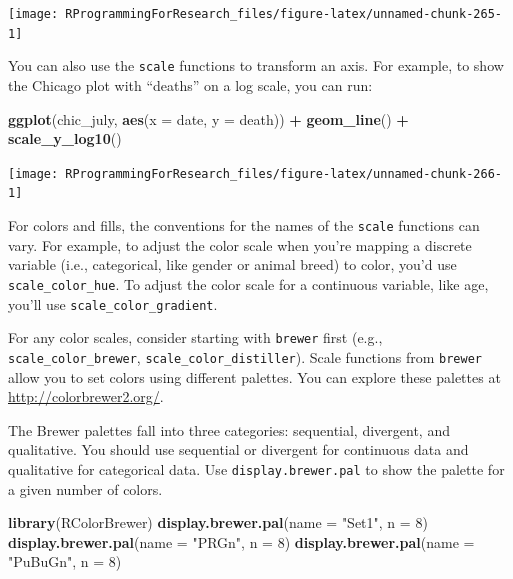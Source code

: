 \documentclass[]{book}
\makeatletter
\newenvironment{Shaded}{\begin{snugshade}}{\end{snugshade}}
\newcommand{\KeywordTok}[1]{\textcolor[rgb]{0.13,0.29,0.53}{\textbf{#1}}}
\newcommand{\DataTypeTok}[1]{\textcolor[rgb]{0.13,0.29,0.53}{#1}}
\newcommand{\DecValTok}[1]{\textcolor[rgb]{0.00,0.00,0.81}{#1}}
\newcommand{\StringTok}[1]{\textcolor[rgb]{0.31,0.60,0.02}{#1}}
\newcommand{\OperatorTok}[1]{\textcolor[rgb]{0.81,0.36,0.00}{\textbf{#1}}}
\newcommand{\NormalTok}[1]{#1}
\newenvironment{kframe}{%
\medskip{}
\setlength{\fboxsep}{.8em}
 \def\at@end@of@kframe{}%
 \ifinner\ifhmode%
  \def\at@end@of@kframe{\end{minipage}}%
  \begin{minipage}{\columnwidth}%
 \fi\fi%
 \def\FrameCommand##1{\hskip\@totalleftmargin \hskip-\fboxsep
 \colorbox{shadecolor}{##1}\hskip-\fboxsep
     \hskip-\linewidth \hskip-\@totalleftmargin \hskip\columnwidth}%
 \MakeFramed {\advance\hsize-\width
   \@totalleftmargin\z@ \linewidth\hsize
   \@setminipage}}%
 {\par\unskip\endMakeFramed%
 \at@end@of@kframe}
\renewenvironment{Shaded}{\begin{kframe}}{\end{kframe}}
\theoremstyle{definition}
\theoremstyle{definition}
\theoremstyle{definition}
\theoremstyle{remark}
\makeatother
\begin{document}
\begin{center}\texttt{[image: RProgrammingForResearch\_files/figure-latex/unnamed-chunk-265-1]} \end{center}

You can also use the \texttt{scale} functions to transform an axis. For
example, to show the Chicago plot with ``deaths'' on a log scale, you
can run:

\begin{Shaded}
\begin{Highlighting}[]
\KeywordTok{ggplot}\NormalTok{(chic_july, }\KeywordTok{aes}\NormalTok{(}\DataTypeTok{x =}\NormalTok{ date, }\DataTypeTok{y =}\NormalTok{ death)) }\OperatorTok{+}\StringTok{ }
\StringTok{  }\KeywordTok{geom_line}\NormalTok{() }\OperatorTok{+}
\StringTok{  }\KeywordTok{scale_y_log10}\NormalTok{()}
\end{Highlighting}
\end{Shaded}

\begin{center}\texttt{[image: RProgrammingForResearch\_files/figure-latex/unnamed-chunk-266-1]} \end{center}

For colors and fills, the conventions for the names of the
\texttt{scale} functions can vary. For example, to adjust the color
scale when you're mapping a discrete variable (i.e., categorical, like
gender or animal breed) to color, you'd use \texttt{scale\_color\_hue}.
To adjust the color scale for a continuous variable, like age, you'll
use \texttt{scale\_color\_gradient}.

For any color scales, consider starting with \texttt{brewer} first
(e.g., \texttt{scale\_color\_brewer}, \texttt{scale\_color\_distiller}).
Scale functions from \texttt{brewer} allow you to set colors using
different palettes. You can explore these palettes at
\url{http://colorbrewer2.org/}.

The Brewer palettes fall into three categories: sequential, divergent,
and qualitative. You should use sequential or divergent for continuous
data and qualitative for categorical data. Use
\texttt{display.brewer.pal} to show the palette for a given number of
colors.

\begin{Shaded}
\begin{Highlighting}[]
\KeywordTok{library}\NormalTok{(RColorBrewer)}
\KeywordTok{display.brewer.pal}\NormalTok{(}\DataTypeTok{name =} \StringTok{"Set1"}\NormalTok{, }\DataTypeTok{n =} \DecValTok{8}\NormalTok{)}
\KeywordTok{display.brewer.pal}\NormalTok{(}\DataTypeTok{name =} \StringTok{"PRGn"}\NormalTok{, }\DataTypeTok{n =} \DecValTok{8}\NormalTok{)}
\KeywordTok{display.brewer.pal}\NormalTok{(}\DataTypeTok{name =} \StringTok{"PuBuGn"}\NormalTok{, }\DataTypeTok{n =} \DecValTok{8}\NormalTok{)}
\end{Highlighting}
\end{Shaded}
\end{document}

